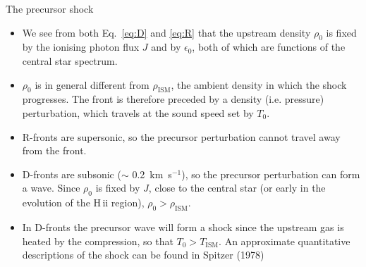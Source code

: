 \begin{frame}{The precursor shock}


\begin{itemize}


\item We see from both Eq.~\ref{eq:D} and \ref{eq:R} that the
  upstream density $\rho_0$ is fixed by the ionising photon flux $J$
  and by $\epsilon_0$, both of which are functions of the central star
  spectrum. 

\item $\rho_0$ is in general different from $\rho_\mathrm{ISM}$, the
  ambient density in which the shock progresses. The front is
  therefore preceded by a density (i.e. pressure) perturbation, which
  travels at the sound speed set by $T_0$.

\item R-fronts are supersonic, so the precursor perturbation cannot
  travel away from the front.

\item D-fronts are subsonic ($\sim$ 0.2~km~s$^{-1}$), so the precursor
  perturbation can form a wave. Since $\rho_0$ is fixed by $J$, close
  to the central star (or early in the evolution of the H\,{\sc ii}
  region), $\rho_0 > \rho_\mathrm{ISM}$. 

\item In D-fronts the precursor wave will form a shock since the
  upstream gas is heated by the compression, so that $T_0 >
  T_\mathrm{ISM}$.  An approximate quantitative descriptions of the
  shock can be found in Spitzer (1978)

\end{itemize}



\end{frame}





